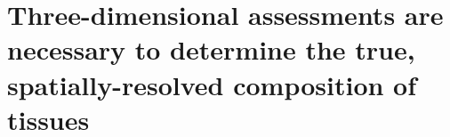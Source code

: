     


\chapter{Three-dimensional assessments are necessary to determine the true, spatially-resolved composition of tissues}
\label{chap:chap-2}

